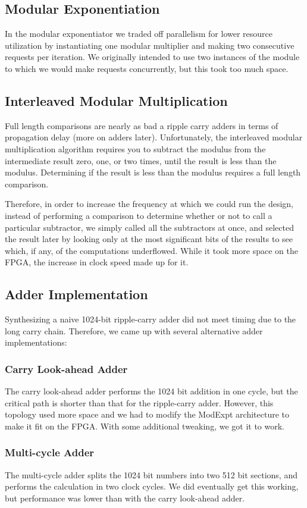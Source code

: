 \documentclass[a4paper,11pt]{report}
\begin{document}
\subsection{Modular Exponentiation}
In the modular exponentiator we traded off parallelism for lower resource utilization by instantiating one modular multiplier and making
two consecutive requests per iteration.
We originally intended to use two instances of the module to which we would make requests concurrently, but this took too much space.

\subsection{Interleaved Modular Multiplication}
\label{sec:multiple-adders}
Full length comparisons are nearly as bad a ripple carry adders in terms of propagation delay (more on adders later).
Unfortunately, the interleaved modular multiplication algorithm requires you to subtract the modulus from the intermediate result zero, one, or two times,
until the result is less than the modulus.
Determining if the result is less than the modulus requires a full length comparison.

Therefore, in order to increase the frequency at which we could run the design,
instead of performing a comparison to determine whether or not to call a particular subtractor,
we simply called all the subtractors at once, and selected the result later by looking only at the most significant bits of the results to see
which, if any, of the computations underflowed.
While it took more space on the FPGA, the increase in clock speed made up for it.

\subsection{Adder Implementation}
Synthesizing a naive 1024-bit ripple-carry adder did not meet timing due to the long carry chain.
Therefore, we came up with several alternative adder implementations:
\subsubsection{Carry Look-ahead Adder}
The carry look-ahead adder performs the 1024 bit addition in one cycle,
but the critical path is shorter than that for the ripple-carry adder.
However, this topology used more space and we had to modify the ModExpt architecture
to make it fit on the FPGA. With some additional tweaking, we got it to work.
\subsubsection{Multi-cycle Adder}
The multi-cycle adder splits the 1024 bit numbers into two 512 bit sections,
and performs the calculation in two clock cycles.
We did eventually get this working,
but performance was lower than with the carry look-ahead adder.
\end{document}
